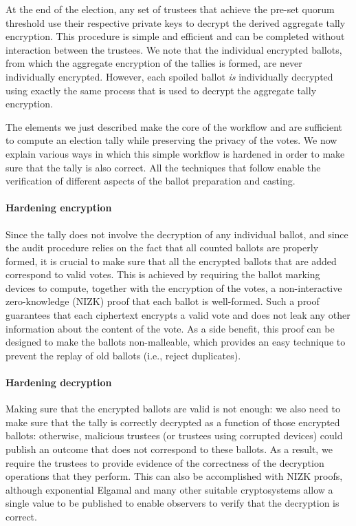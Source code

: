 \documentclass[letterpaper, 10pt, twocolumn]{article}
\newcommand{\elgamal}{Elgamal\xspace}
\begin{document}
At the end of the election, any set of trustees that achieve the pre-set quorum
threshold use their respective private keys to decrypt the derived aggregate tally
encryption.  This procedure is simple and efficient and can be completed
without interaction between the trustees.  We note that the individual 
encrypted ballots, from which the aggregate encryption of the tallies
is formed, are never individually encrypted.  However, each spoiled ballot {\em is}
individually decrypted using exactly the same process that is used to decrypt
the aggregate tally encryption.

The elements we just described make the core of the workflow and are
sufficient to compute an election tally while preserving the privacy
of the votes. We now explain various ways in which this simple
workflow is hardened in order to make sure that the tally is also
correct. All the techniques that follow enable the verification of
different aspects of the ballot preparation and casting.

\paragraph{Hardening encryption}
\label{sec:hardening-encryption}
Since the tally does not involve the decryption of any individual
ballot, and since the audit procedure relies on the fact that all
counted ballots are properly formed, it is crucial to make sure that
all the encrypted ballots that are added correspond to valid votes.
This is achieved by requiring the ballot marking devices to compute,
together with the encryption of the votes, a non-interactive
zero-knowledge (NIZK) proof that each ballot is well-formed. Such a
proof guarantees that each ciphertext encrypts a valid vote and does not
leak any other information about the content of the vote. As a side
benefit, this proof can be designed to make the ballots non-malleable,
which provides an easy technique to prevent the replay of old ballots
(i.e., reject duplicates).

\paragraph{Hardening decryption}
\label{sec:hardening-decryption}
Making sure that the encrypted ballots are valid is not enough: we
also need to make sure that the tally is correctly decrypted as a
function of those encrypted ballots: otherwise, malicious trustees (or
trustees using corrupted devices) could publish an outcome that does
not correspond to these ballots. As a result, we require the trustees
to provide evidence of the correctness of the decryption operations
that they perform.  This can also be accomplished with NIZK proofs,
although exponential \elgamal and many other suitable cryptosystems
allow a single value to be published to enable observers to verify that
the decryption is correct.
\end{document}
